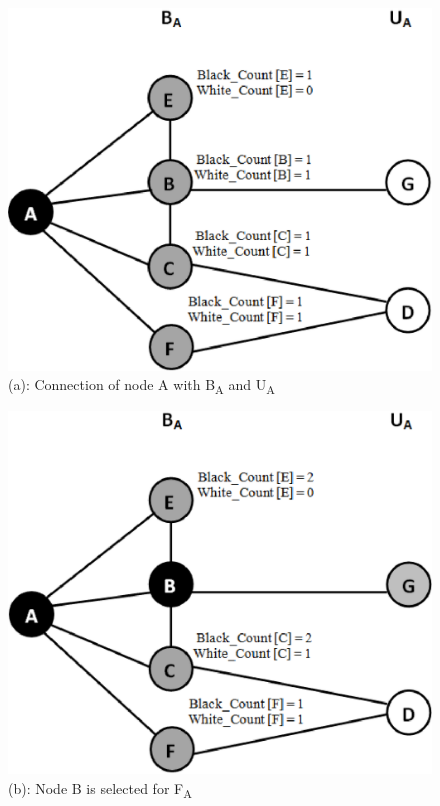  \begin{figure}[h]
\begin{minipage}{.33\textwidth}
\centering
\includegraphics[width=0.8\linewidth,height=.7\linewidth]{Figures/dis1.eps}%
\\(a): Connection of node A with B\textsubscript{A} and U\textsubscript{A}
\end{minipage}%
\begin{minipage}{.33\textwidth}
\centering
\includegraphics[width=0.8\linewidth,height=.7\linewidth]{Figures/dis2.eps}
\\(b): Node B is selected for F\textsubscript{A}
\end{minipage}
\begin{minipage}{.33\textwidth}
\centering

\end{minipage}
\end{figure}
